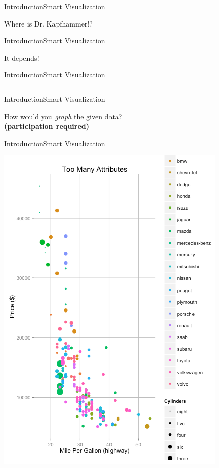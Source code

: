 \begin{frame}{Introduction}{Smart Visualization}
  \begin{center}
      Where is Dr. Kapfhammer!?
  \end{center}
  \end{frame}

\begin{frame}{Introduction}{Smart Visualization}
  \begin{center}
      It depends!
  \end{center}
  \end{frame}

\begin{frame}{Introduction}{Smart Visualization}
    \inputminted{java}{data/mtcars.csv}
  \end{frame}

\begin{frame}{Introduction}{Smart Visualization}
  \begin{center}
      How would you \textit{graph} the given data? \\
      \textbf{(participation required)}
  \end{center}
  \end{frame}

\begin{frame}{Introduction}{Smart Visualization}
  \begin{center}
      \includegraphics[scale=0.35]{images/bad.pdf}
  \end{center}
  \end{frame}

